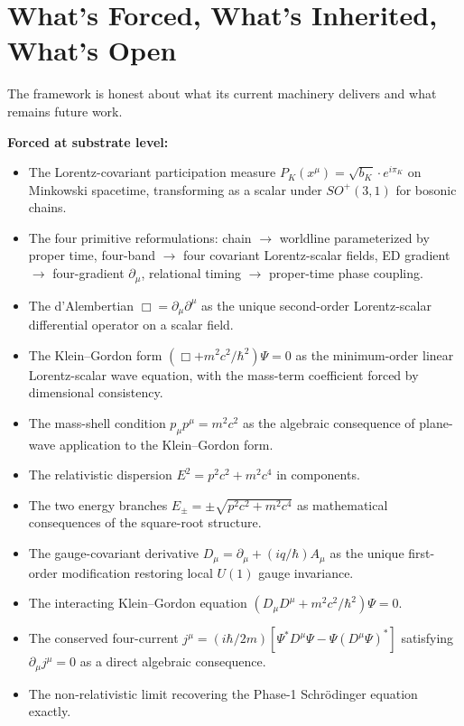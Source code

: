 \documentclass[11pt,a4paper]{article}
\begin{document}
\section{What's Forced, What's Inherited, What's Open}

The framework is honest about what its current machinery delivers and what remains future work.

\textbf{Forced at substrate level:}

\begin{itemize}[noitemsep]
  \item The Lorentz-covariant participation measure $P_K(x^\mu) = \sqrt{b_K}\cdot e^{i\pi_K}$ on Minkowski spacetime, transforming as a scalar under $SO^+(3,1)$ for bosonic chains.
  \item The four primitive reformulations: chain $\to$ worldline parameterized by proper time, four-band $\to$ four covariant Lorentz-scalar fields, ED gradient $\to$ four-gradient $\partial_\mu$, relational timing $\to$ proper-time phase coupling.
  \item The d'Alembertian $\Box = \partial_\mu\partial^\mu$ as the unique second-order Lorentz-scalar differential operator on a scalar field.
  \item The Klein--Gordon form $(\Box + m^2c^2/\hbar^2)\Psi = 0$ as the minimum-order linear Lorentz-scalar wave equation, with the mass-term coefficient forced by dimensional consistency.
  \item The mass-shell condition $p_\mu p^\mu = m^2c^2$ as the algebraic consequence of plane-wave application to the Klein--Gordon form.
  \item The relativistic dispersion $E^2 = p^2c^2 + m^2c^4$ in components.
  \item The two energy branches $E_\pm = \pm\sqrt{p^2c^2 + m^2c^4}$ as mathematical consequences of the square-root structure.
  \item The gauge-covariant derivative $D_\mu = \partial_\mu + (iq/\hbar)A_\mu$ as the unique first-order modification restoring local $U(1)$ gauge invariance.
  \item The interacting Klein--Gordon equation $(D_\mu D^\mu + m^2c^2/\hbar^2)\Psi = 0$.
  \item The conserved four-current $j^\mu = (i\hbar/2m)[\Psi^* D^\mu\Psi - \Psi(D^\mu\Psi)^*]$ satisfying $\partial_\mu j^\mu = 0$ as a direct algebraic consequence.
  \item The non-relativistic limit recovering the Phase-1 Schr\"odinger equation exactly.
\end{itemize}
\end{document}
